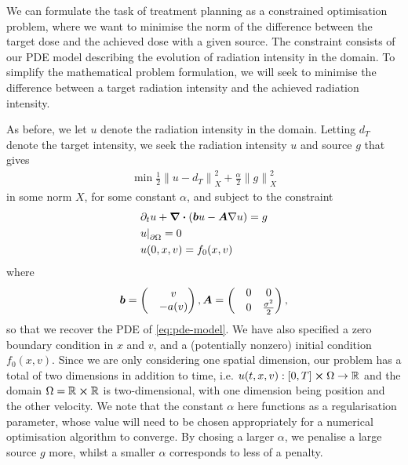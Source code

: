 We can formulate the task of treatment planning as a constrained optimisation problem, where we want to minimise the norm of the difference between the target dose and the achieved dose with a given source. The constraint consists of our PDE model describing the evolution of radiation intensity in the domain. To simplify the mathematical problem formulation, we will seek to minimise the difference between a target radiation intensity and the achieved radiation intensity.

As before, we let $u$ denote the radiation intensity in the domain. Letting $d_T$ denote the target intensity, we seek the radiation intensity $u$ and source $g$ that gives
%
\begin{align} 
    \label{eq:to-minimise}
    \min \frac{1}{2} {\lVert u - d_T \rVert}^2_{X} + \frac{\alpha}{2} {\lVert g \rVert}^2_{X}
\end{align}
%
in some norm $X$, for some constant $\alpha$, and subject to the constraint
%
\begin{align}
    \label{eq:pde-constraint}
    &\partial_t u + \div{(\boldsymbol{b} u - \boldsymbol{A} \nabla u)} = g\\
    &{u \rvert}_{\partial \Omega} = 0\\
    & u(0,x,v) = f_0(x,v)
\end{align}
%
where 
%
\begin{equation}
    \boldsymbol{b} = 
    \begin{pmatrix}
        &v\\
        &-a(v)
    \end{pmatrix},
    \boldsymbol{A} = 
    \begin{pmatrix}
        &0 &0\\
        &0 &\frac{\sigma^2}{2}
    \end{pmatrix},
    \end{equation}
so that we recover the PDE of \autoref{eq:pde-model}. We have also specified a zero boundary condition in $x$ and $v$, and a (potentially nonzero) initial condition $f_0(x,v)$. Since we are only considering one spatial dimension, our problem has a total of two dimensions in addition to time, i.e. $u(t,x,v): [0,T] \cross \Omega \rightarrow \mathbb{R}$ and the domain $\Omega=\mathbb{R}\cross\mathbb{R}$ is two-dimensional, with one dimension being position and the other velocity. We note that the constant $\alpha$ here functions as a regularisation parameter, whose value will need to be chosen appropriately for a numerical optimisation algorithm to converge. By chosing a larger $\alpha$, we penalise a large source $g$ more, whilst a smaller $\alpha$ corresponds to less of a penalty.

